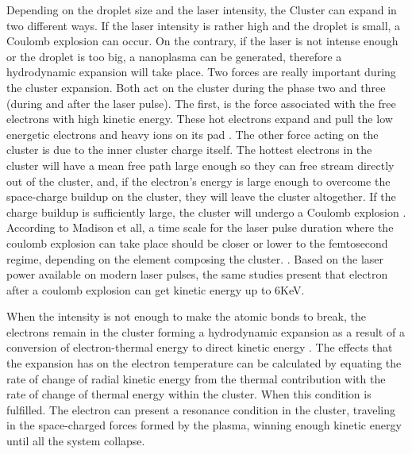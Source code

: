 Depending on the droplet size and the laser intensity, the Cluster can expand in two different ways. If the laser intensity is rather high and the droplet is small, a Coulomb explosion can occur. On the contrary, if the laser is not intense enough or the droplet is too big, a nanoplasma can be generated, therefore a hydrodynamic expansion will take place. 
Two forces are really important during the cluster expansion. Both act on the cluster during the phase two and three (during and after the laser pulse). The first, is the force associated with the free electrons with high kinetic energy. These hot electrons expand and pull the low energetic electrons and heavy ions on its pad \cite{ditmire_interaction_1996}. The other force acting on the cluster is due to the inner cluster charge itself. The hottest electrons in the cluster will have a mean free path large enough so they can free stream directly out of the cluster, and, if the electron’s energy is large enough to overcome the space-charge buildup on the cluster, they will leave the cluster altogether. If the charge buildup is sufficiently large, the cluster will undergo a Coulomb explosion \cite{haught_formation_1970}. According to Madison et all, a time scale for the laser pulse duration where the coulomb explosion can take place should be closer or lower to the femtosecond regime, depending on the element composing the cluster. \cite{madison_role_2004}. Based on the laser power available on modern laser pulses, the same studies present that electron after a coulomb explosion can get kinetic energy up to 6KeV.


When the intensity is not enough to make the atomic bonds to break, the electrons remain in the cluster forming a hydrodynamic expansion as a result of a conversion of electron-thermal energy to direct kinetic energy \cite{erk_nobel_2009}. The effects that the expansion has on the electron temperature can be calculated by equating the rate of change of radial kinetic energy from the thermal contribution with the rate of change of thermal energy within the cluster. When this condition is fulfilled. The electron can present a resonance condition in the cluster, traveling in the space-charged forces formed by the plasma, winning enough kinetic energy until all the system collapse.

